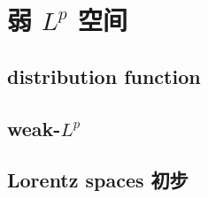 \section{弱 \texorpdfstring{\(L^p\)}{Lᵖ} 空间}
\label{b2:sec:1702}


\subsection{distribution function}
\label{b2:subsec:170201}

\subsection{weak-\texorpdfstring{\(L^p\)}{Lp}}
\label{b2:subsec:170202}

\subsection{Lorentz spaces 初步}
\label{b2:subsec:170203}


